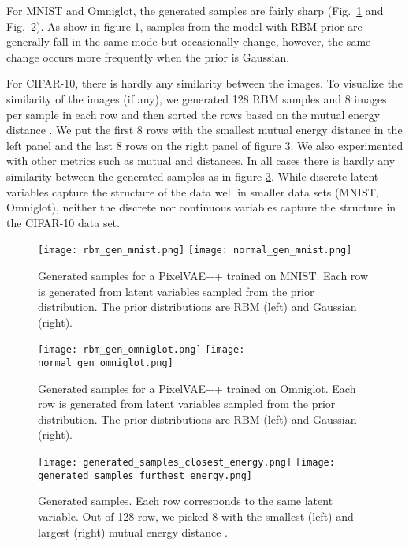 \documentclass{article}
\begin{document}
For MNIST and Omniglot, the generated samples are fairly sharp (Fig.~\ref{fig:mnist_gen} and Fig.~\ref{fig:omni_gen}). As show in figure \ref{fig:mnist_gen}, samples from the model with RBM prior are generally fall in the same mode but occasionally change, however, the same change occurs more frequently when the prior is Gaussian.


For CIFAR-10, there is hardly any similarity between the images. To visualize the similarity of the images (if any), we generated 128 RBM samples and 8 images per sample in each row and then sorted the rows based on the mutual energy distance \cite{salimans2017pixelcnn++}. We put the first 8 rows with the smallest mutual energy distance in the left panel and the last 8 rows on the right panel of figure \ref{fig:gencifar}. We also experimented with other metrics such as mutual  and  distances. In all cases there is hardly any similarity between the generated samples as in figure \ref{fig:gencifar}. While discrete latent variables capture the structure of the data well in smaller data sets (MNIST, Omniglot), neither the discrete nor continuous variables capture the structure in the CIFAR-10 data set.


\begin{figure}[h]
    \centering
    \texttt{[image: rbm\_gen\_mnist.png]}
    \texttt{[image: normal\_gen\_mnist.png]}
    \caption{Generated samples for a PixelVAE++ trained on MNIST. Each row is generated from latent variables sampled from the prior distribution. The prior distributions are RBM (left) and Gaussian (right).}
    \label{fig:mnist_gen}
\end{figure}

\begin{figure}[h]
    \centering
    \texttt{[image: rbm\_gen\_omniglot.png]}
    \texttt{[image: normal\_gen\_omniglot.png]}
    \caption{Generated samples for a PixelVAE++ trained on Omniglot. Each row is generated from latent variables sampled from the prior distribution. The prior distributions are RBM (left) and Gaussian (right).}
    \label{fig:omni_gen}
\end{figure}

\begin{figure}[htbp]
    \centering
    \texttt{[image: generated\_samples\_closest\_energy.png]}
    \texttt{[image: generated\_samples\_furthest\_energy.png]}
    \caption{Generated samples. Each row corresponds to the same latent variable. Out of 128 row, we picked 8 with the smallest (left) and largest (right) mutual energy distance \cite{salimans2017pixelcnn++}.}
    \label{fig:gencifar}
\end{figure}
\end{document}
